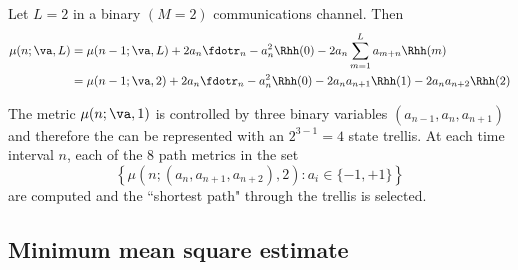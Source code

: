 \begin{example}
Let $L=2$ in a binary $(M=2)$ communications channel.
Then
\begin{align*}
   \mu(n;\va ,L)
     &= \mu(n-1;\va ,L) +
         2a_n \fdotr_n -a_n^2 \Rhh(0) - 2a_n\sum_{m=1}^L a_{m+n} \Rhh(m)
   \\&= \mu(n-1;\va ,2) +
         2a_n \fdotr_n -a_n^2 \Rhh(0)
       - 2a_n a_{n+1} \Rhh(1)
       - 2a_n a_{n+2} \Rhh(2)
\end{align*}

The metric $\mu(n;\va ,1)$ is controlled by three binary variables
$(a_{n-1},a_n,a_{n+1})$ and therefore the can be represented with
an $2^{3-1}=4$ state trellis.
At each time interval $n$, each of the 8 path metrics in the set
\[
   \left\{ \mu(n;(a_n,a_{n+1},a_{n+2}),2): a_i\in\{-1,+1\} \right\}
\]
are computed and the ``shortest path" through the trellis is selected.
\end{example}

\subsection{Minimum mean square estimate}
\label{sec:eq_mmse}

